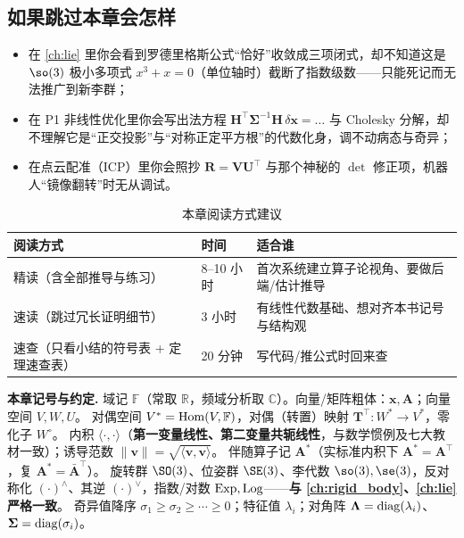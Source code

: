\subsection*{如果跳过本章会怎样}
\begin{itemize}
  \item 在 \cref{ch:lie} 里你会看到罗德里格斯公式“恰好”收敛成三项闭式，却不知道这是 $\so(3)$ 极小多项式 $x^3+x=0$（单位轴时）截断了指数级数——只能死记而无法推广到新李群；
  \item 在 P1 非线性优化里你会写出法方程 $\mathbf{H}^\top\boldsymbol{\Sigma}^{-1}\mathbf{H}\,\delta\mathbf{x}=\dots$ 与 Cholesky 分解，却不理解它是“正交投影”与“对称正定平方根”的代数化身，调不动病态与奇异；
  \item 在点云配准（ICP）里你会照抄 $\mathbf{R}=\mathbf{V}\mathbf{U}^\top$ 与那个神秘的 $\det$ 修正项，机器人“镜像翻转”时无从调试。
\end{itemize}

\begin{table}[H]\centering\small
\caption{本章阅读方式建议}
\begin{tabular}{lll}
\toprule
阅读方式 & 时间 & 适合谁 \\
\midrule
精读（含全部推导与练习） & 8--10 小时 & 首次系统建立算子论视角、要做后端/估计推导 \\
速读（跳过冗长证明细节） & 3 小时 & 有线性代数基础、想对齐本书记号与结构观 \\
速查（只看小结的符号表 + 定理速查表） & 20 分钟 & 写代码/推公式时回来查 \\
\bottomrule
\end{tabular}
\end{table}

\begin{note}
\textbf{本章记号与约定.}\;
域记 $\mathbb{F}$（常取 $\mathbb{R}$，频域分析取 $\mathbb{C}$）。向量/矩阵粗体：$\mathbf{x},\mathbf{A}$；向量空间 $V,W,U$。
对偶空间 $V^*=\operatorname{Hom}(V,\mathbb{F})$，对偶（转置）映射 $\mathbf{T}^\top:W^*\to V^*$，零化子 $W^\circ$。
内积 $\langle\cdot,\cdot\rangle$（\textbf{第一变量线性、第二变量共轭线性}，与数学惯例及七大教材一致）；诱导范数 $\|\mathbf{v}\|=\sqrt{\langle\mathbf{v},\mathbf{v}\rangle}$。
伴随算子记 $\mathbf{A}^*$（实标准内积下 $\mathbf{A}^*=\mathbf{A}^\top$，复 $\mathbf{A}^*=\bar{\mathbf{A}}^\top$）。
旋转群 $\SO(3)$、位姿群 $\SE(3)$、李代数 $\so(3),\se(3)$，反对称化 $(\cdot)^\wedge$、其逆 $(\cdot)^\vee$，指数/对数 $\operatorname{Exp},\operatorname{Log}$——\textbf{与 \cref{ch:rigid_body}、\cref{ch:lie} 严格一致}。
奇异值降序 $\sigma_1\ge\sigma_2\ge\cdots\ge0$；特征值 $\lambda_i$；对角阵 $\boldsymbol{\Lambda}=\operatorname{diag}(\lambda_i)$、$\boldsymbol{\Sigma}=\operatorname{diag}(\sigma_i)$。
\end{note}

